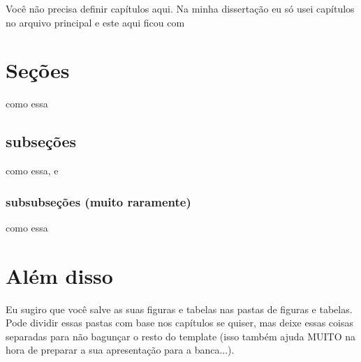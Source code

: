 Você não precisa definir capítulos aqui. Na minha dissertação eu só usei capítulos no arquivo principal e este aqui ficou com

\section{Seções}
	como essa 
	
	\subsection{subseções}
		como essa, e 
		
		\subsubsection{subsubseções (muito raramente)}
			como essa
			
\section{Além disso}
	Eu sugiro que você salve as suas figuras e tabelas nas pastas de figuras e tabelas. Pode dividir essas pastas com base nos capítulos se quiser, mas deixe essas coisas separadas para não bagunçar o resto do template (isso também ajuda MUITO na hora de preparar a sua apresentação para a banca...).
